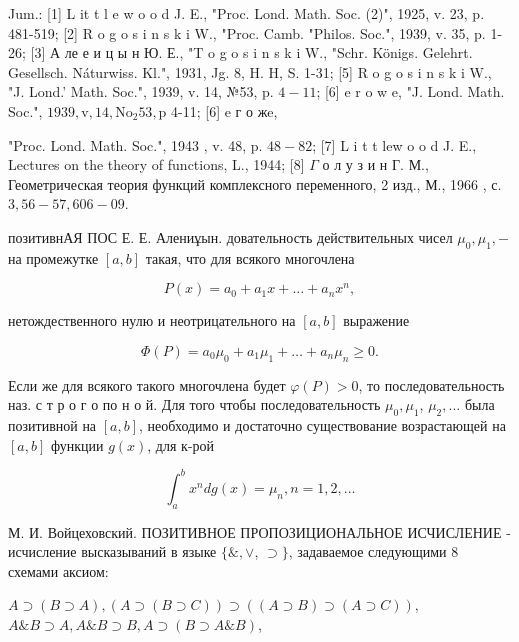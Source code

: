 \documentclass[10pt]{article}
\begin{document}
Jum.: [1] L it t l e w o o d J. E., "Proc. Lond. Math. Soc. (2)", 1925, v. 23, p. 481-519; [2] R o g o s i n s k i W., "Proc. Camb. "Philos. Soc.", 1939, v. 35, p. 1-26; [3] А ле е и ц ы н Ю. Е., "T o g o s i n s k i W., "Schr. Königs. Gelehrt. Gesellsch. Náturwiss. Kl.", 1931, Jg. 8, H. H, S. 1-31; [5] R o g o s i n s k i W., "J. Lond.' Math. Soc.", 1939, v. 14, №53, p. $4-11$; [6] e r o w e, "J. Lond. Math. Soc.", $1939, \mathrm{v}, 14, \mathrm{No}_{2} 53, \mathrm{p}$ 4-11; [6] e г о жe,

"Proc. Lond. Math. Soc.", 1943 , v. 48, p. $48-82$; [7] L i t t lew o o d J. E., Lectures on the theory of functions, L., 1944; [8] $\Gamma$ о л у з и н Г. М., Геометрическая теория функций комплексного переменного, 2 изд., М., 1966 , с. $3,56-57,606-09$.



позитивнАЯ ПОС Е. Е. Алениұын. довательность действительных чисел $\mu_{0}, \mu_{1},-$ на промежутке $[a, b]$ такая, что для всякого многочлена



\[

P(x)=a_{0}+a_{1} x+\ldots+a_{n} x^{n},

\]



нетождественного нулю и неотрицательного на $[a, b]$ выражение



\[

\Phi(P)=a_{0} \mu_{0}+a_{1} \mu_{1}+\ldots+a_{n} \mu_{n} \geqslant 0 .

\]



Если же для всякого такого многочлена будет $\varphi(P)>0$, то последовательность наз. с т р о г о по н о й. Для того чтобы последовательность $\mu_{0}, \mu_{1}$, $\mu_{2}, \ldots$ была позитивной на $[a, b]$, необходимо и достаточно существование возрастающей на $[a, b]$ функции $g(x)$, для к-рой



\[

\int_{a}^{b} x^{n} d g(x)=\mu_{n}, n=1,2, \ldots

\]



М. И. Войцеховский. ПОЗИТИВНОЕ ПРОПОЗИЦИОНАЛЬНОЕ ИСЧИСЛЕНИЕ - исчисление высказываний в языке $\{\&, \vee$, $\supset\}$, задаваемое следующими 8 схемами аксиом:



$A \supset(B \supset A),(A \supset(B \supset C)) \supset((A \supset B) \supset(A \supset C))$, $A \& B \supset A, A \& B \supset B, A \supset(B \supset A \& B)$,
\end{document}
